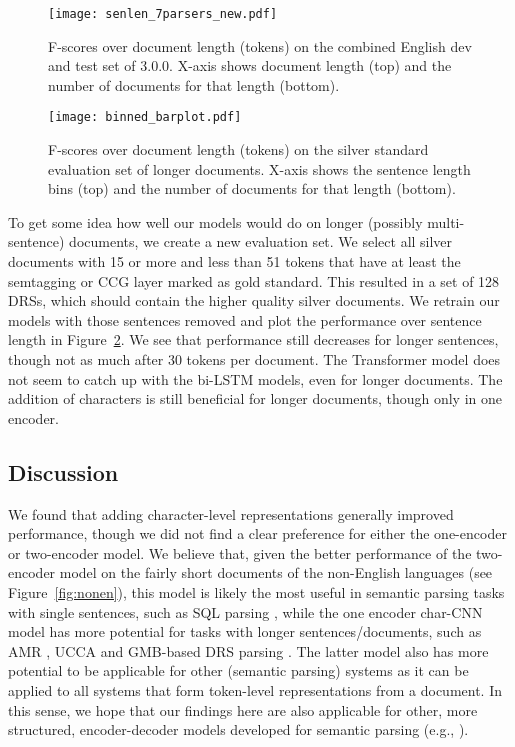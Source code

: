 \documentclass[11pt,a4paper]{article}
\begin{document}
\begin{figure}[!t]
  \texttt{[image: senlen\_7parsers\_new.pdf]}
  \caption{F-scores over document length (tokens) on the combined English dev and test set of 3.0.0. X-axis shows document length (top) and the number of documents for that length (bottom).\label{fig:senlen}}
  \vspace*{-0.2cm}
\end{figure}

\begin{figure}[!t]
  \texttt{[image: binned\_barplot.pdf]}
  \caption{F-scores over document length (tokens) on the silver standard evaluation set of longer documents. X-axis shows the sentence length bins (top) and the number of documents for that length (bottom).\label{fig:silvereval}}
  \vspace*{-0.2cm}
\end{figure}


To get some idea how well our models would do on longer (possibly multi-sentence) documents, we create a new evaluation set. We select all silver documents with 15 or more and less than 51 tokens that have at least the semtagging or CCG layer marked as gold standard. This resulted in a set of 128 DRSs, which should contain the higher quality silver documents. We retrain our models with those sentences removed and plot the performance over sentence length in Figure~\ref{fig:silvereval}. We see that performance still decreases for longer sentences, though not as much after 30 tokens per document. The Transformer model does not seem to catch up with the bi-LSTM models, even for longer documents. The addition of characters is still beneficial for longer documents, though only in one encoder. 

\subsection{Discussion}

We found that adding character-level representations generally improved performance, though we did not find a clear preference for either the one-encoder or two-encoder model. 
We believe that, given the better performance of the two-encoder model on the fairly short documents of the non-English languages (see Figure~\ref{fig:nonen}), this model is likely the most useful in semantic parsing tasks with single sentences, such as SQL parsing \citep{zelle1996learning, iyer-etal-2017-learning, finegan-dollak-etal-2018-improving}, while the one encoder char-CNN model has more potential for tasks with longer sentences/documents, such as AMR \citep{amr:13}, UCCA \citep{ucca:13} and GMB-based DRS parsing \citep{GMB:2017,neural_drs_gmb:18, liu-etal-2019-acl}. The latter model also has more potential to be applicable for other (semantic parsing) systems as it can be applied to all systems that form token-level representations from a document. In this sense, we hope that our findings here are also applicable for other, more structured, encoder-decoder models developed for semantic parsing (e.g., \citealp{yin-neubig-2017-syntactic,krishnamurthy-etal-2017-neural,coarsefine:18,liu-etal-2019-acl}).
\end{document}
